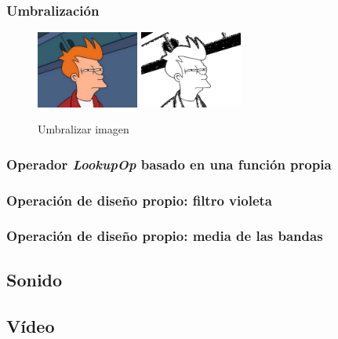 \subsubsection{Umbralización}
\vskip0.3cm
\begin{figure}[H]
 \centering
  \includegraphics[width=0.3\textwidth]{imagenes/Fry.jpg}
  \includegraphics[width=0.3\textwidth]{imagenes/fryUmbralizado.jpg}
 \caption{Umbralizar imagen}
 \label{diseño}
\end{figure}
\subsubsection{Operador \textit{LookupOp} basado en una función propia}
\subsubsection{Operación de diseño propio: filtro violeta}
\subsubsection{Operación de diseño propio: media de las bandas}
\subsection{Sonido}
\subsection{Vídeo}



